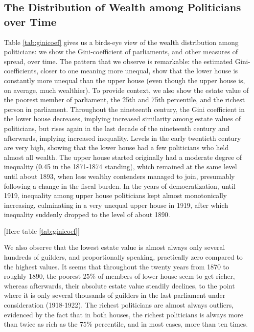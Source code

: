 \subsection{The Distribution of Wealth among Politicians over Time}

    Table \ref{tab:ginicoef} gives us a birds-eye view of the wealth distribution among politicians: we show the Gini-coefficient of parliaments, and other measures of spread, over time. The pattern that we observe is remarkable: the estimated Gini-coefficients, closer to one meaning more unequal, show that the lower house is constantly more unequal than the upper house (even though the upper house is, on average, much wealthier). To provide context, we also show the estate value of the poorest member of parliament, the 25th and 75th percentile, and the richest person in parliament. Throughout the nineteenth century, the Gini coefficient in the lower house decreases, implying increased similarity among estate values of politicians, but rises again in the last decade of the nineteenth century and afterwards, implying increased inequality. Levels in the early twentieth century are very high, showing that the lower house had a few politicians who held almost all wealth. The upper house started originally had a moderate degree of inequality (0.45 in the 1871-1874 standing), which remained at the same level until about 1893, when less wealthy contenders managed to join, presumably following a change in the fiscal burden. In the years of democratization, until 1919, inequality among upper house politicians kept almost monotonically increasing, culminating in a very unequal upper house in 1919, after which inequality suddenly dropped to the level of about 1890. 
    
    \begin{center}
        [Here table \ref{tab:ginicoef}]
    \end{center}
    
    We also observe that the lowest estate value is almost always only several hundreds of guilders, and proportionally speaking, practically zero compared to the highest values. It seems that throughout the twenty years from 1870 to roughly 1890, the poorest 25\% of members of lower house seem to get richer, whereas afterwards, their absolute estate value steadily declines, to the point where it is only several thousands of guilders in the last parliament under consideration (1918-1922). The richest politicians are almost always outliers, evidenced by the fact that in both houses, the richest politicians is always more than twice as rich as the 75\% percentile, and in most cases, more than ten times. 
    
